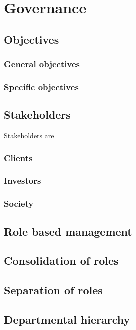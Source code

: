 \chapter{Governance}

\section{Objectives}

\subsection{General objectives}

\subsection{Specific objectives}

\section{Stakeholders}
Stakeholders are

\subsection{Clients}

\subsection{Investors}

\subsection{Society}

\section{Role based management}


\section{Consolidation of roles}

\section{Separation of roles}

\section{Departmental hierarchy}

